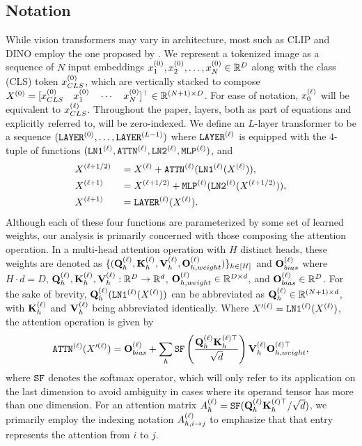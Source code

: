 \documentclass[10pt,twocolumn,letterpaper]{article}
\begin{document}
\subsection{Notation}
While vision transformers may vary in architecture, most such as CLIP and DINO employ the one proposed by \cite{dosovitskiy2021vit}. We represent a tokenized image as a sequence of $N$ input embeddings $\emb{0}{1}, \emb{0}{2}, \ldots, \emb{0}{N} \in \R^D$ along with the class (CLS) token $\emb{0}{CLS}$, which are vertically stacked to compose $\Emb{0} = \tr{[\emb{0}{CLS} \quad \emb{0}{1} \quad \cdots \quad \emb{0}{N}]} \in \R^{(N + 1) \times D}$. For ease of notation, $\emb{\ell}{0}$ will be equivalent to $\emb{\ell}{CLS}$. Throughout the paper, layers, both as part of equations and explicitly referred to, will be zero-indexed. We define an $L$-layer transformer to be a sequence $(\lyr{0}, \ldots, \lyr{L - 1})$ where $\lyr{\ell}$ is equipped with the $4$-tuple of functions $(\lyn{1}{\ell}, \attn{\ell}, \lyn{2}{\ell}, \mlp{\ell})$, and \begin{alignat}{3}
    & \Emb{\ell + 1/2}  && = \Emb{\ell} + \attn{\ell}(\lyn{1}{\ell}(\Emb{\ell})), \label{eqn:layer}   \\
    & \Emb{\ell + 1}    && = \Emb{\ell + 1/2} + \mlp{\ell}(\lyn{2}{\ell}(\Emb{\ell + 1/2})), \\
    & \Emb{\ell + 1}    && = \lyr{\ell}(\Emb{\ell}).
\end{alignat} Although each of these four functions are parameterized by some set of learned weights, our analysis is primarily concerned with those composing the attention operation. In a multi-head attention operation with $H$ distinct heads, these weights are denoted as $\cbn{(\Ql{\ell}_h, \Kl{\ell}_h, \Vl{\ell}_h, \Olw{\ell}{h})}_{h \in [H]}$ and $\Olb{\ell}$ where $H \cdot d = D$, $\Ql{\ell}_h, \Kl{\ell}_h, \Vl{\ell}_h: \R^D \to \R^{d}$, $\Olw{\ell}{h} \in \R^{D \times d}$, and $\Olb{\ell} \in \R^D$. For the sake of brevity, $\Ql{\ell}_h(\lyn{1}{\ell}(\Emb{\ell}))$ can be abbreviated as $\Ql{\ell}_h \in \R^{(N + 1) \times d}$, with $\Kl{\ell}_h$ and $\Vl{\ell}_h$ being abbreviated identically. Where $\Embp{\ell} = \lyn{1}{\ell}(\Emb{\ell})$, the attention operation is given by \begin{align}
    \attn{\ell}(\Embp{\ell}) = \Olb{\ell} + \dss{h}{} \sf\pfrac{\Ql{\ell}_h{\mbf{K}^{(\ell)\top}_h}}{\sqrt{d}}\Vl{\ell}_h{\mbf{O}^{(\ell)\top}_{h, weight}}, \label{eqn:attn}
\end{align} where $\sf$ denotes the softmax operator, which will only refer to its application on the last dimension to avoid ambiguity in cases where its operand tensor has more than one dimension. For an attention matrix $\Al{\ell}_h = \sf(\Ql{\ell}_h{\mbf{K}^{(\ell)\top}_h} / \sqrt{d})$, we primarily employ the indexing notation $\Al{\ell}_{h, i \to j}$ to emphasize that that entry represents the attention from $i$ to $j$.
\end{document}
